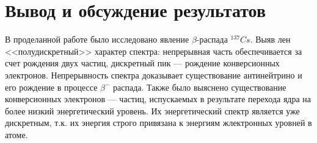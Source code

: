 \documentclass[a4paper,12pt]{article}
\begin{document}
\newpage

\section{Вывод и обсуждение результатов}
		В проделанной работе было исследовано явление $\beta$-распада $^{137}Cs$. Выяв лен <<полудискретный>> характер спектра: непрерывная часть обеспечивается за счет рождения двух частиц, дискретный пик --- рождение конверсионных электронов.
		Непрерывность спектра доказывает существование антинейтрино и его рождение в процессе $\beta^-$ распада. Также было выяснено существование конверсионных электронов --- частиц, испускаемых в результате перехода ядра на более низкий энергетический уровень. Их энергетический спектр является уже дискретным, т.к. их энергия строго привязана к энергиям жлектронных уровней в атоме.
\end{document}
